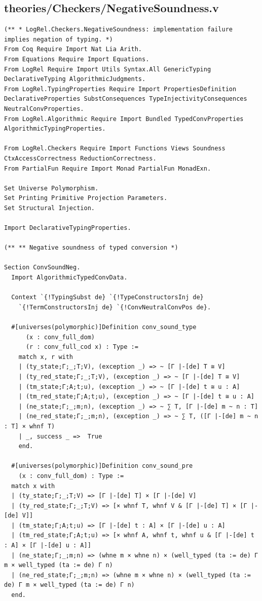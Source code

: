 \subsection*{theories/Checkers/NegativeSoundness.v}
\begin{lstlisting}
(** * LogRel.Checkers.NegativeSoundness: implementation failure implies negation of typing. *)
From Coq Require Import Nat Lia Arith.
From Equations Require Import Equations.
From LogRel Require Import Utils Syntax.All GenericTyping DeclarativeTyping AlgorithmicJudgments.
From LogRel.TypingProperties Require Import PropertiesDefinition DeclarativeProperties SubstConsequences TypeInjectivityConsequences NeutralConvProperties.
From LogRel.Algorithmic Require Import Bundled TypedConvProperties AlgorithmicTypingProperties.

From LogRel.Checkers Require Import Functions Views Soundness CtxAccessCorrectness ReductionCorrectness.
From PartialFun Require Import Monad PartialFun MonadExn.

Set Universe Polymorphism.
Set Printing Primitive Projection Parameters.
Set Structural Injection.

Import DeclarativeTypingProperties.

(** ** Negative soundness of typed conversion *)

Section ConvSoundNeg.
  Import AlgorithmicTypedConvData.

  Context `{!TypingSubst de} `{!TypeConstructorsInj de}
    `{!TermConstructorsInj de} `{!ConvNeutralConvPos de}.

  #[universes(polymorphic)]Definition conv_sound_type
      (x : conv_full_dom)
      (r : conv_full_cod x) : Type :=
    match x, r with
    | (ty_state;Γ;_;T;V), (exception _) => ~ [Γ |-[de] T ≅ V]
    | (ty_red_state;Γ;_;T;V), (exception _) => ~ [Γ |-[de] T ≅ V]
    | (tm_state;Γ;A;t;u), (exception _) => ~ [Γ |-[de] t ≅ u : A]
    | (tm_red_state;Γ;A;t;u), (exception _) => ~ [Γ |-[de] t ≅ u : A]
    | (ne_state;Γ;_;m;n), (exception _) => ~ ∑ T, [Γ |-[de] m ~ n : T]
    | (ne_red_state;Γ;_;m;n), (exception _) => ~ ∑ T, ([Γ |-[de] m ~ n : T] × whnf T)
    | _, success _ =>  True
    end.

  #[universes(polymorphic)]Definition conv_sound_pre
    (x : conv_full_dom) : Type :=
  match x with
  | (ty_state;Γ;_;T;V) => [Γ |-[de] T] × [Γ |-[de] V]
  | (ty_red_state;Γ;_;T;V) => [× whnf T, whnf V & [Γ |-[de] T] × [Γ |-[de] V]]
  | (tm_state;Γ;A;t;u) => [Γ |-[de] t : A] × [Γ |-[de] u : A]
  | (tm_red_state;Γ;A;t;u) => [× whnf A, whnf t, whnf u & [Γ |-[de] t : A] × [Γ |-[de] u : A]]
  | (ne_state;Γ;_;m;n) => (whne m × whne n) × (well_typed (ta := de) Γ m × well_typed (ta := de) Γ n)
  | (ne_red_state;Γ;_;m;n) => (whne m × whne n) × (well_typed (ta := de) Γ m × well_typed (ta := de) Γ n)
  end.



\end{lstlisting}
